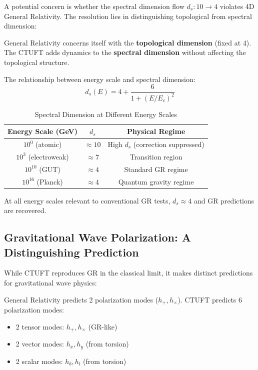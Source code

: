 A potential concern is whether the spectral dimension flow $d_s: 10 \to 4$ violates 4D General Relativity. The resolution lies in distinguishing topological from spectral dimension:

\begin{proposition}[GR Compatibility]
General Relativity concerns itself with the \textbf{topological dimension} (fixed at 4). The CTUFT adds dynamics to the \textbf{spectral dimension} without affecting the topological structure.
\end{proposition}

The relationship between energy scale and spectral dimension:
\begin{equation}
    d_s(E) = 4 + \frac{6}{1 + (E/E_c)^2}
    \label{eq:spectral_vs_energy}
\end{equation}

\begin{table}[htbp]
\centering
\caption{Spectral Dimension at Different Energy Scales}
\begin{tabular}{@{}ccc@{}}
\hline
Energy Scale (GeV) & $d_s$ & Physical Regime \\
\hline
$10^0$ (atomic) & $\approx 10$ & High $d_s$ (correction suppressed) \\
$10^3$ (electroweak) & $\approx 7$ & Transition region \\
$10^{10}$ (GUT) & $\approx 4$ & Standard GR regime \\
$10^{16}$ (Planck) & $\approx 4$ & Quantum gravity regime \\
\hline
\end{tabular}
\label{tab:spectral_energy}
\end{table}

At all energy scales relevant to conventional GR tests, $d_s \approx 4$ and GR predictions are recovered.

\subsection{Gravitational Wave Polarization: A Distinguishing Prediction}

While CTUFT reproduces GR in the classical limit, it makes distinct predictions for gravitational wave physics:

\begin{theorem}
General Relativity predicts 2 polarization modes ($h_+, h_\times$). CTUFT predicts 6 polarization modes:
\begin{itemize}
    \item 2 tensor modes: $h_+, h_\times$ (GR-like)
    \item 2 vector modes: $h_x, h_y$ (from torsion)
    \item 2 scalar modes: $h_b, h_l$ (from torsion)
\end{itemize}
\end{theorem}

